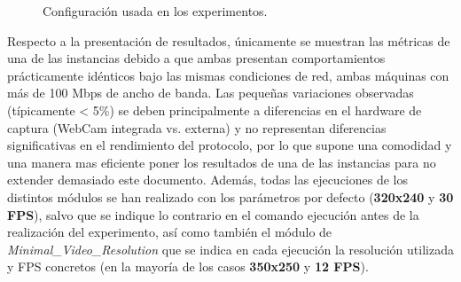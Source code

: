 \begin{figure}[htbp]
    \centering
    \caption{Configuración usada en los experimentos.}
    \label{fig:conf_red}
\end{figure}

Respecto a la presentación de resultados, únicamente se muestran las métricas de una de las instancias debido a que ambas presentan comportamientos prácticamente idénticos bajo las mismas condiciones de red, ambas máquinas con más de 100 Mbps de ancho de banda. Las pequeñas variaciones observadas (típicamente < 5\%) se deben principalmente a diferencias en el hardware de captura (WebCam integrada vs. externa) y no representan diferencias significativas en el rendimiento del protocolo, por lo que supone una comodidad y una manera mas eficiente poner los resultados de una de las instancias para no extender demasiado este documento. Además, todas las ejecuciones de los distintos módulos se han realizado con los parámetros por defecto (\textbf{320x240} y \textbf{30 FPS}), salvo que se indique lo contrario en el comando ejecución antes de la realización del experimento, así como también el módulo de \textit{Minimal\_Video\_Resolution} que se indica en cada ejecución la resolución utilizada y FPS concretos (en la mayoría de los casos \textbf{350x250} y \textbf{12 FPS}).
\vspace{\baselineskip}

